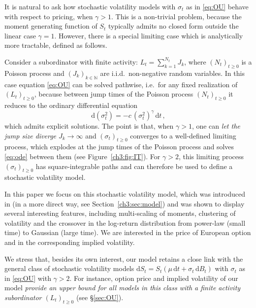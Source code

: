 \documentclass[a4paper,reqno,11pt]{amsart}
\numberwithin{equation}{section}
\newcommand{\dd}{\text{\rm d}}             %
\newcommand{\N}{\mathbb{N}}
\def\dd{\mathrm{d}}
\begin{document}
\smallskip

It is natural to ask how stochastic volatility models with $\sigma_t$ as in
\eqref{eq:OU} behave with respect to pricing, when $\gamma > 1$.
This is a non-trivial problem, because
the moment generating function of $S_t$ typically
admits no closed form outside the linear case $\gamma = 1$. 
However, there is a special limiting case 
which is analytically more tractable, defined as follows.

Consider a subordinator with
finite activity: 
$L_t = \sum_{k=1}^{N_t} J_k$, where $(N_t)_{t\ge 0}$ is a Poisson process 
and $(J_k)_{k\in\N}$ 
are i.i.d.\ non-negative random variables. 
In this case equation \eqref{eq:OU} can be solved pathwise, i.e.\
for any fixed realization of $(L_t)_{t\ge 0}$,
because between jump times of the Poisson process $(N_t)_{t\ge 0}$
it reduces to the ordinary differential equation 
\begin{equation}\label{eq:ode}
	\dd (\sigma^2_t) = -c \, (\sigma^2_t)^\gamma \, \dd t \,,
\end{equation}
which admits
explicit solutions.
The point is that, when $\gamma > 1$, one can \emph{let the jump size
diverge $J_k \to \infty$} and $(\sigma_t)_{t\ge 0}$ converges to
a well-defined limiting process, which explodes at the
jump times of the Poisson process and solves \eqref{eq:ode} between them
(see Figure~\ref{ch3:fig:IT}{\sc \subref{figura2}}).
For $\gamma > 2$, this limiting process $(\sigma_t)_{t\ge 0}$ has square-integrable paths
and can therefore be used to define a stochastic volatility model.


\smallskip

In this paper we focus on 
this stochastic volatility model, which was introduced in \cite{cf:ACDP}
(in a more direct way, see Section~\ref{ch3:sec:model})
and was shown to display several interesting features,
including multi-scaling of moments, clustering of volatility
and the crossover in the log-return distribution from power-law (small time) to Gaussian (large time).
We are interested in the price of European option and in the corresponding
implied volatility.


We stress that, 
besides its own interest, our model retains a close link with the general
class of stochastic volatility models
$\dd S_t = S_t (\mu \, \dd t + \sigma_t \, \dd B_t)$ 
with $\sigma_t$ as in \eqref{eq:OU} with $\gamma > 2$. 
For instance, 
option price and implied volatility of our model \emph{provide an upper bound
for all models in this class with a finite activity subordinator $(L_t)_{t\ge 0}$}
(see \S\ref{sec:OU}).
\end{document}
